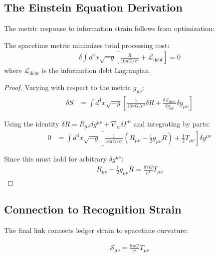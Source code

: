 \documentclass[12pt]{article}
\begin{document}
\subsection{The Einstein Equation Derivation}

The metric response to information strain follows from optimization:

\begin{theorem}
The spacetime metric minimizes total processing cost:
\begin{align}
\delta \int d^4x \sqrt{-g} \left[ \frac{R}{16\pi G/c^4} + \mathcal{L}_{\text{debt}} \right] = 0
\end{align}
where $\mathcal{L}_{\text{debt}}$ is the information debt Lagrangian.
\end{theorem}

\begin{proof}
Varying with respect to the metric $g_{\mu\nu}$:
\begin{align}
\delta S &= \int d^4x \sqrt{-g} \left[ \frac{1}{16\pi G/c^4} \delta R + \frac{\delta \mathcal{L}_{\text{debt}}}{\delta g_{\mu\nu}} \delta g_{\mu\nu} \right]
\end{align}

Using the identity $\delta R = R_{\mu\nu} \delta g^{\mu\nu} + \nabla_\alpha \delta \Gamma^\alpha$ and integrating by parts:
\begin{align}
0 &= \int d^4x \sqrt{-g} \left[ \frac{1}{16\pi G/c^4} \left(R_{\mu\nu} - \frac{1}{2} g_{\mu\nu} R\right) + \frac{1}{2} T_{\mu\nu} \right] \delta g^{\mu\nu}
\end{align}

Since this must hold for arbitrary $\delta g^{\mu\nu}$:
\begin{align}
R_{\mu\nu} - \frac{1}{2} g_{\mu\nu} R = \frac{8\pi G}{c^4} T_{\mu\nu}
\end{align}
\end{proof}

\subsection{Connection to Recognition Strain}

The final link connects ledger strain to spacetime curvature:

\begin{theorem}
\begin{align}
\mathcal{S}_{\mu\nu} = \frac{8\pi G}{c^4} T_{\mu\nu}
\end{align}
\end{theorem}
\end{document}
